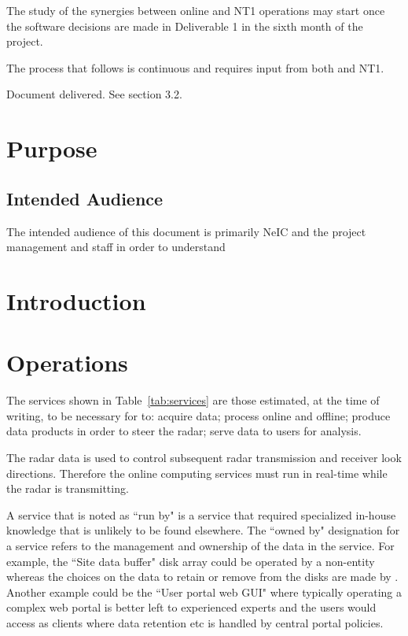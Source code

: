 \documentclass[12pt,a4paper]{article}
\begin{document}
The study of the synergies between \ED online and NT1 operations may start once the software decisions are made in Deliverable 1 in the sixth month of the project.

The process that follows is continuous and requires input from both \ED and NT1.

Document delivered. See section 3.2.

\section{Purpose}
\label{purpose}

\subsection{Intended Audience}

The intended audience of this document is primarily NeIC and the \ED project management and staff in order to understand 

\section{Introduction}
\label{intro}



\section{\ED Operations}

The services shown in Table~\ref{tab:services} are those estimated, at the time of writing, to be necessary for \ED to: acquire data; process online and offline; produce data products in order to steer the radar; serve data to users for analysis.

The radar data is used to control subsequent radar transmission and receiver look directions.
Therefore the online computing services must run in real-time while the radar is transmitting.

A service that is noted as ``run by" \EC is a service that required specialized in-house knowledge that is unlikely to be found elsewhere.
The ``owned by" designation for a service refers to the management and ownership of the data in the service.
For example, the ``Site data buffer" disk array could be operated by a non-\EC entity whereas the choices on the data to retain or remove from the disks are made by \EC.
Another example could be the ``User portal web GUI" where typically operating a complex web portal is better left to experienced experts and the \EC users would access as clients where data retention etc is handled by central portal policies.
\end{document}
